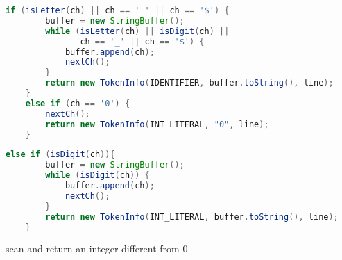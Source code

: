 \documentclass[8pt,a4paper,compress]{beamer}
\begin{document}
\begin{frame}[fragile]
\begin{overprint}
\begin{tcolorbox}[enhanced,drop shadow southwest,sharp corners,size=fbox,colback=white,fontlower=\small\ttfamily,collower=silver900]
\begin{lstlisting}[language=Java,style=focusout]
    if (isLetter(ch) || ch == '_' || ch == '$') {
        buffer = new StringBuffer();
        while (isLetter(ch) || isDigit(ch) || 
               ch == '_' || ch == '$') {
            buffer.append(ch);
            nextCh();
        }
        return new TokenInfo(IDENTIFIER, buffer.toString(), line);
    }
    else if (ch == '0') {
        nextCh();
        return new TokenInfo(INT_LITERAL, "0", line);
    }
\end{lstlisting}
\begin{lstlisting}[language=Java,style=focusin,backgroundcolor=\color{lime100}]
    else if (isDigit(ch)){
        buffer = new StringBuffer();
        while (isDigit(ch)) {
            buffer.append(ch);
            nextCh();
        }
        return new TokenInfo(INT_LITERAL, buffer.toString(), line);
    }
\end{lstlisting}

\tcblower
\begin{minipage}[t][.25cm][t]{\textwidth}
scan and return an integer different from 0
\end{minipage}
\end{tcolorbox}
\end{overprint}
\end{frame}

\begin{frame}[fragile]
\pause

A state transition diagram for recognizing keywords
\begin{center}
}
\end{center}
\end{frame}
\end{document}
